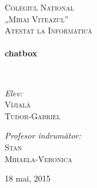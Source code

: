 \begin{titlepage}
\begin{center}

\textsc{\LARGE Colegiul Național \\[0.5cm] „Mihai Viteazul”}\\[1.5cm]

\textsc{\Large Atestat la Informatică}\\[0.5cm]

\HRule \\[0.4cm]
{ \Huge \bfseries chatbox \\[0.4cm] }

\HRule \\[1.5cm]

\noindent
\begin{minipage}[t]{0.4\textwidth}
\begin{flushleft} \large
\emph{Elev:}\\
\textsc{Vîjială\\Tudor-Gabriel}
\end{flushleft}
\end{minipage}
\begin{minipage}[b]{0.4\textwidth}
\begin{flushright} \large
\emph{Profesor îndrumător:} \\
\textsc{Stan\\ Mihaela-Veronica}
\end{flushright}
\end{minipage}

\vfill

{\Large 18 mai, 2015}

\end{center}
\end{titlepage}